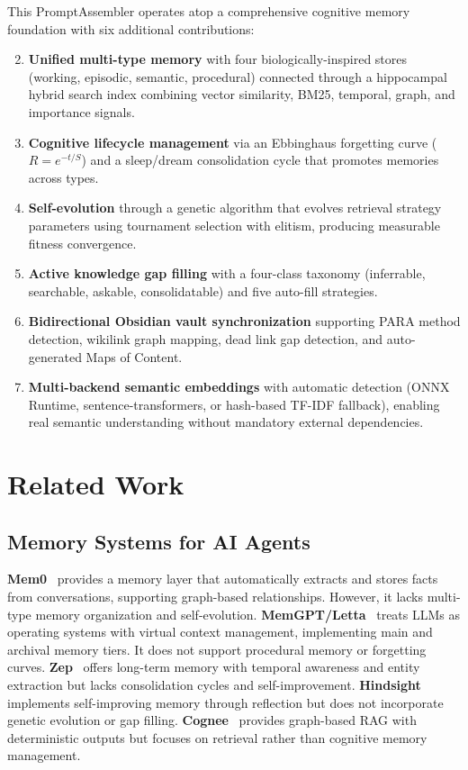 \documentclass[runningheads]{llncs}
\begin{document}
\noindent This PromptAssembler operates atop a comprehensive cognitive memory foundation with six additional contributions:

\begin{enumerate}[leftmargin=*]\setcounter{enumi}{1}
    \item \textbf{Unified multi-type memory} with four biologically-inspired stores (working, episodic, semantic, procedural) connected through a hippocampal hybrid search index combining vector similarity, BM25, temporal, graph, and importance signals.
    \item \textbf{Cognitive lifecycle management} via an Ebbinghaus forgetting curve ($R = e^{-t/S}$) and a sleep/dream consolidation cycle that promotes memories across types.
    \item \textbf{Self-evolution} through a genetic algorithm that evolves retrieval strategy parameters using tournament selection with elitism, producing measurable fitness convergence.
    \item \textbf{Active knowledge gap filling} with a four-class taxonomy (inferrable, searchable, askable, consolidatable) and five auto-fill strategies.
    \item \textbf{Bidirectional Obsidian vault synchronization} supporting PARA method detection, wikilink graph mapping, dead link gap detection, and auto-generated Maps of Content.
    \item \textbf{Multi-backend semantic embeddings} with automatic detection (ONNX Runtime, sentence-transformers, or hash-based TF-IDF fallback), enabling real semantic understanding without mandatory external dependencies.
\end{enumerate}

\section{Related Work}\label{sec:related}

\subsection{Memory Systems for AI Agents}

\textbf{Mem0}~\cite{mem0_2024} provides a memory layer that automatically extracts and stores facts from conversations, supporting graph-based relationships. However, it lacks multi-type memory organization and self-evolution.
\textbf{MemGPT/Letta}~\cite{packer2023memgpt} treats LLMs as operating systems with virtual context management, implementing main and archival memory tiers. It does not support procedural memory or forgetting curves.
\textbf{Zep}~\cite{zep2024} offers long-term memory with temporal awareness and entity extraction but lacks consolidation cycles and self-improvement.
\textbf{Hindsight}~\cite{hindsight2024} implements self-improving memory through reflection but does not incorporate genetic evolution or gap filling.
\textbf{Cognee}~\cite{cognee2024} provides graph-based RAG with deterministic outputs but focuses on retrieval rather than cognitive memory management.
\end{document}
